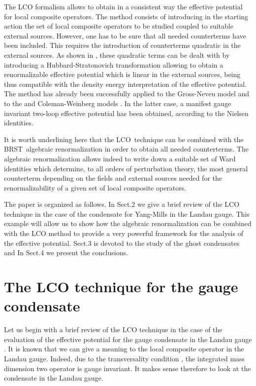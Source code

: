 \documentclass[a4paper,12pt]{article}
\begin{document}
The LCO formalism allows to obtain in a consistent way the effective
potential for local composite operators. The method consists of introducing
in the starting action the set of local composite operators to be studied
coupled to suitable external sources. However, one has to be sure that all
needed counterterms have been included. This requires the introduction of
counterterms quadratic in the external sources. As shown in \cite{v2,v3},
these quadratic terms can be dealt with by introducing a
Hubbard-Stratonovich transformation allowing to obtain a renormalizable
effective potential which is linear in the external sources, being thus
compatible with the density energy interpretation of the effective
potential. The method has already been successfully applied to the
Gross-Neveu model \cite{v2} and to the \coordHE{} and
Coleman-Weinberg models \cite{v3}. In the latter case, a manifest gauge
invariant two-loop effective potential has been obtained, according to the
Nielsen identities.

It is worth underlining here that the LCO\ technique can be combined with
the BRST\ algebraic renormalization \cite{book} in order to obtain all
needed counterterms. The algebraic renormalization allows indeed to write
down a suitable set of Ward identities which determine, to all orders of
perturbation theory, the most general counterterm depending on the fields
and external sources needed for the renormalizability of a given set of
local composite operators.

The paper is organized as follows. In Sect.2 we give a brief review of the
LCO technique in the case of the condensate \coordHE{} for Yang-Mills in the Landau gauge. This example will allow us to show how
the algebraic renormalization can be combined with the LCO method to provide
a very powerful framework for the analysis of the effective potential.
Sect.3 is devoted to the study of the ghost condensates \coordHE{} and \coordHE{}In Sect.4 we present the conclusions.

\section{The LCO technique for the gauge condensate \coordHE{}}

Let us begin with a brief review of the LCO technique \cite{v2,v3} in the
case of the evaluation of the effective potential for the gauge condensate \coordHE{} in the Landau gauge \cite
{v1}. It is known that we can give a meaning to the local composite operator 
\coordHE{} in the Landau gauge. Indeed, due to the
transversality condition \coordHE{}, the integrated mass
dimension two operator \coordHE{} is gauge
invariant. It makes sense therefore to look at the condensate \coordHE{} in the Landau gauge.
\end{document}
